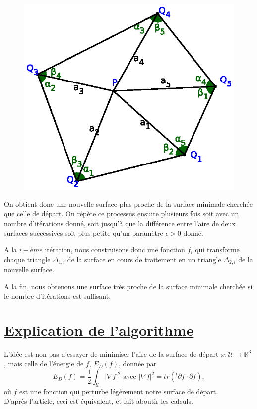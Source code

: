 \documentclass {report}
\newcommand{\R}{\mathbb{R}}
\begin{document}
\begin{figure}[h!]
      \centering 
      \includegraphics[scale=1]{Images_Fichiers/6.eps}
\end{figure}

On obtient donc une nouvelle surface plus proche de la surface minimale cherchée que celle de départ. On répète ce processus ensuite plusieurs fois soit avec un nombre d'itérations donné, soit jusqu'à que la différence entre l'aire de deux surfaces successives soit plus petite qu'un paramètre $\epsilon >0$ donné. 

A la $i-ème$ itération, nous construisons donc une fonction $f_i$ qui transforme chaque triangle $\Delta_{1,i}$ de la surface en cours de traitement en un triangle $\Delta_{2,i}$ de la nouvelle surface.

A la fin, nous obtenons une surface très proche de la surface minimale cherchée si le nombre d'itérations est suffisant.

\section[Explication de l'algorithme]{\uline{Explication de l'algorithme}}

L'idée est non pas d'essayer de minimiser l'aire de la surface de départ $x:\mathscr{U}\rightarrow \R^3$ , mais celle de l'énergie de $f$, $E_D(f)$, donnée par $$E_D(f) = \frac{1}{2} \int_\mathscr{U} |\nabla f|^2 \text{ avec } |\nabla f|^2 = tr(^t\partial f \cdot \partial f),$$
où $f$ est une fonction qui perturbe légèrement notre surface de départ.\\
D'après l'article, ceci est équivalent, et fait aboutir les calculs. 
\end{document}
